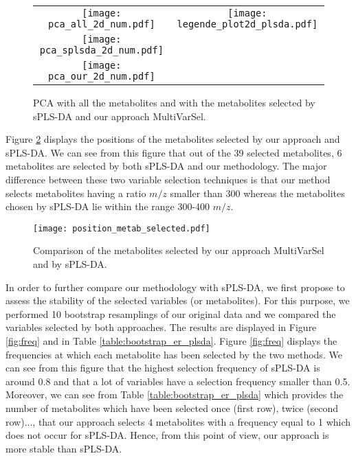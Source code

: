 \begin{figure}[!h]
\centering
\begin{tabular}{cc}
\texttt{[image: pca\_all\_2d\_num.pdf]} & 
\texttt{[image: legende\_plot2d\_plsda.pdf]}\\
\texttt{[image: pca\_splsda\_2d\_num.pdf]}
& \\
\texttt{[image: pca\_our\_2d\_num.pdf]}
& \\
\end{tabular}
\caption{PCA with all the metabolites and with the metabolites selected by sPLS-DA and our approach \textsf{MultiVarSel}.\label{fig:pcaall}}
\end{figure}


Figure \ref{fig:metabsel} displays the positions of the metabolites selected by our approach and sPLS-DA. We can see from this figure that out of the 39 selected 
metabolites, 6 metabolites are selected by both sPLS-DA and our methodology. The major difference between these two variable selection techniques is that
our method selects metabolites having a ratio $m/z$ smaller than 300 whereas the metabolites chosen by sPLS-DA lie within the range 300-400 $m/z$.


\begin{figure}[!h]
\begin{center}
\texttt{[image: position\_metab\_selected.pdf]}
\caption{Comparison of the metabolites selected by our approach \textsf{MultiVarSel} and by sPLS-DA.\label{fig:metabsel}}
\end{center}
\end{figure}



In order to further compare our methodology with sPLS-DA, we first propose to assess the stability of the selected variables (or metabolites). For this purpose, we 
performed 10 bootstrap resamplings of our original data and we compared the variables selected by both approaches. The results are displayed in
Figure \ref{fig:freq}  and in Table \ref{table:bootstrap_er_plsda}. Figure \ref{fig:freq} displays the frequencies at which each metabolite
has been selected by the two methods. We can see from this figure that the highest selection frequency of sPLS-DA is around 0.8 and that a lot of variables have a selection frequency smaller than 0.5. 
Moreover, we can see from Table \ref{table:bootstrap_er_plsda} which provides the number of metabolites which have been selected once (first row), 
twice (second row)..., that our approach selects 4 metabolites with a frequency equal to 1 which does not occur for sPLS-DA. Hence, from this point of view, our approach is
 more stable than sPLS-DA.





